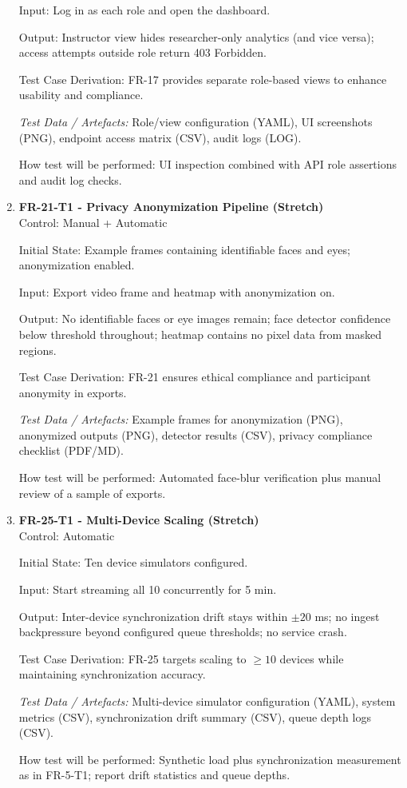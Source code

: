 \documentclass[12pt, titlepage]{article}
\begin{document}
\begin{enumerate}
Input: Log in as each role and open the dashboard.

Output: Instructor view hides researcher-only analytics (and vice versa); access attempts outside role return 403 Forbidden.

Test Case Derivation: FR-17 provides separate role-based views to enhance usability and compliance.

\textit{Test Data / Artefacts:} Role/view configuration (YAML), UI screenshots (PNG), endpoint access matrix (CSV), audit logs (LOG).

How test will be performed: UI inspection combined with API role assertions and audit log checks.

\item \textbf{FR-21-T1 - Privacy Anonymization Pipeline (Stretch)} \\

Control: Manual + Automatic

Initial State: Example frames containing identifiable faces and eyes; anonymization enabled.

Input: Export video frame and heatmap with anonymization on.

Output: No identifiable faces or eye images remain; face detector confidence below threshold throughout; heatmap contains no pixel data from masked regions.

Test Case Derivation: FR-21 ensures ethical compliance and participant anonymity in exports.

\textit{Test Data / Artefacts:} Example frames for anonymization (PNG), anonymized outputs (PNG), detector results (CSV), privacy compliance checklist (PDF/MD).

How test will be performed: Automated face-blur verification plus manual review of a sample of exports.

\item \textbf{FR-25-T1 - Multi-Device Scaling (Stretch)} \\

Control: Automatic

Initial State: Ten device simulators configured.

Input: Start streaming all 10 concurrently for 5 min.

Output: Inter-device synchronization drift stays within $\pm 20$ ms; no ingest backpressure beyond configured queue thresholds; no service crash.

Test Case Derivation: FR-25 targets scaling to $\ge 10$ devices while maintaining synchronization accuracy.

\textit{Test Data / Artefacts:} Multi-device simulator configuration (YAML), system metrics (CSV), synchronization drift summary (CSV), queue depth logs (CSV).

How test will be performed: Synthetic load plus synchronization measurement as in FR-5-T1; report drift statistics and queue depths.

\end{enumerate}
\end{document}
